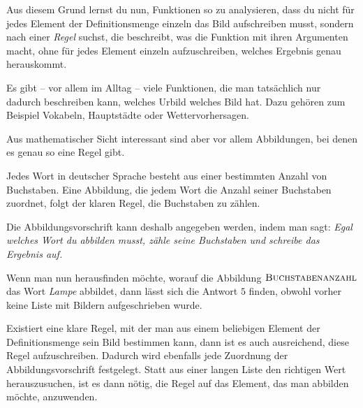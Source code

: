 \documentclass[../../main.tex]{subfiles}
\begin{document}
Aus diesem Grund lernst du nun, Funktionen so zu analysieren, dass du nicht für jedes Element der Definitionsmenge einzeln das Bild aufschreiben musst, sondern nach einer \emph{Regel} suchst, die beschreibt, was die Funktion mit ihren Argumenten macht, ohne für jedes Element einzeln aufzuschreiben, welches Ergebnis genau herauskommt. 

Es gibt -- vor allem im Alltag -- viele Funktionen, die man tatsächlich nur dadurch beschreiben kann, welches Urbild welches Bild hat. Dazu gehören zum Beispiel Vokabeln, Hauptstädte oder Wettervorhersagen.

Aus mathematischer Sicht interessant sind aber vor allem Abbildungen, bei denen es genau so eine Regel gibt.

\begin{example}{}

    Jedes Wort in deutscher Sprache besteht aus einer bestimmten Anzahl von Buchstaben. Eine Abbildung, die jedem Wort die Anzahl seiner Buchstaben zuordnet, folgt der klaren Regel, die Buchstaben zu zählen.
    
    Die Abbildungsvorschrift kann deshalb angegeben werden, indem man sagt: \emph{Egal welches Wort du abbilden musst, zähle seine Buchstaben und schreibe das Ergebnis auf.} 
    
    Wenn man nun herausfinden möchte, worauf die Abbildung $\textsc{Buchstabenanzahl}$ das Wort \emph{Lampe} abbildet, dann lässt sich die Antwort $5$ finden, obwohl vorher keine Liste mit Bildern aufgeschrieben wurde.
\end{example}

Existiert eine klare Regel, mit der man aus einem beliebigen Element der Definitionsmenge sein Bild bestimmen kann, dann ist es auch ausreichend, diese Regel aufzuschreiben. Dadurch wird ebenfalls jede Zuordnung der Abbildungsvorschrift festgelegt. Statt aus einer langen Liste den richtigen Wert herauszusuchen, ist es dann nötig, die Regel auf das Element, das man abbilden möchte, anzuwenden.
\end{document}
